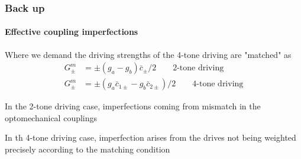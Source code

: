 \documentclass[aspectratio=43]{beamer}
\begin{document}
\begin{frame}
	
	\frametitle{Back up}
	\framesubtitle{Effective coupling imperfections}
	
	Where we demand the driving strengths of the 4-tone driving are "matched" as
	\begin{align}
		G_{\pm}^{m} &= \pm(g_{a} - g_{b})\bar{c}_{\pm} / 2 \qquad \textrm{2-tone driving} \nonumber\\
		G_{\pm}^{m} &= \pm(g_{a}\bar{c}_{1\pm} - g_{b}\bar{c}_{2\pm}) / 2 \qquad \textrm{4-tone driving} \nonumber
	\end{align}
	
	\vspace{0.5 cm}
	
	In the 2-tone driving case, imperfections coming from mismatch in the optomechanical couplings
	
	\vspace{0.5 cm}
		
	In th 4-tone driving case, imperfection arises from the drives not being weighted precisely according to the matching condition

\end{frame}
\end{document}
